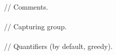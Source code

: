 \begin{bigbigpre}
 \\
// Comments. \\
 \\
// Capturing group. \\
 \\
// Quantifiers (by default, greedy). \\

\end{bigbigpre}
